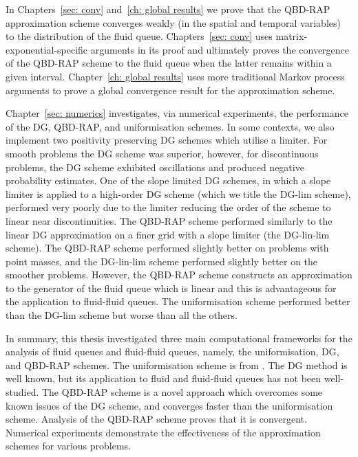 In Chapters~\ref{sec: conv} and~\ref{ch: global results} we prove that the QBD-RAP approximation scheme converges weakly (in the spatial and temporal variables) to the distribution of the fluid queue. Chapters~\ref{sec: conv} uses matrix-exponential-specific arguments in its proof and ultimately proves the convergence of the QBD-RAP scheme to the fluid queue when the latter remains within a given interval. Chapter~\ref{ch: global results} uses more traditional Markov process arguments to prove a global convergence result for the approximation scheme. 

Chapter~\ref{sec: numerics} investigates, via numerical experiments, the performance of the DG, QBD-RAP, and uniformisation schemes. In some contexts, we also implement two positivity preserving DG schemes which utilise a limiter. For smooth problems the DG scheme was superior, however, for discontinuous problems, the DG scheme exhibited oscillations and produced negative probability estimates. One of the slope limited DG schemes, in which a slope limiter is applied to a high-order DG scheme (which we title the DG-lim scheme), performed very poorly due to the limiter reducing the order of the scheme to linear near discontinuities. The QBD-RAP scheme performed similarly to the linear DG approximation on a finer grid with a slope limiter (the DG-lin-lim scheme). The QBD-RAP scheme performed slightly better on problems with point masses, and the DG-lin-lim scheme performed slightly better on the smoother problems. However, the QBD-RAP scheme constructs an approximation to the generator of the fluid queue which is linear and this is advantageous for the application to fluid-fluid queues. The uniformisation scheme performed better than the DG-lim scheme but worse than all the others. 

In summary, this thesis investigated three main computational frameworks for the analysis of fluid queues and fluid-fluid queues, namely, the uniformisation, DG, and QBD-RAP schemes. The uniformisation scheme is from \cite{bo2013}. The DG method is well known, but its application to fluid and fluid-fluid queues has not been well-studied. The QBD-RAP scheme is a novel approach which overcomes some known issues of the DG scheme, and converges faster than the uniformisation scheme. Analysis of the QBD-RAP scheme proves that it is convergent. Numerical experiments demonstrate the effectiveness of the approximation schemes for various problems. 